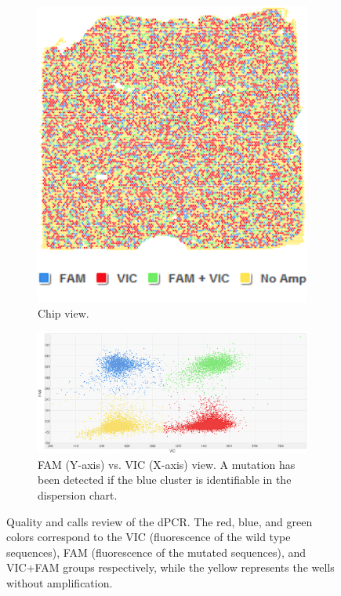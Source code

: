 \begin{enumerate}[font=\bfseries]
    \begin{figure}[t]
        \centering
        \begin{subfigure}{0.30\textwidth}
            \centering
            \includegraphics[width=\textwidth]{Images/chapter_3/FAM_VIC_chip.png}
            \caption{Chip view.}
            \label{fig:FAM_VIC_chip}
        \end{subfigure}
        \hfill
        \begin{subfigure}{0.69\textwidth}
            \centering
            \includegraphics[width=\textwidth]{Images/chapter_3/FAM_VIC.png}
            \caption{FAM\texttrademark{} (Y-axis) vs. VIC\texttrademark{} (X-axis) view. A mutation has been detected if the blue cluster is identifiable in the dispersion chart.}
            \label{fig:FAM_VIC_dispersion}
        \end{subfigure}
        \hfill
        \caption{Quality and calls review of the dPCR. The red, blue, and green colors correspond to the VIC\texttrademark{} (fluorescence of the wild type sequences), FAM\texttrademark{} (fluorescence of the mutated sequences), and VIC\texttrademark{}+FAM\texttrademark{} groups respectively, while the yellow represents the wells without amplification.}
        \label{fig:FAM_VIC}
    \end{figure}
\end{enumerate}

